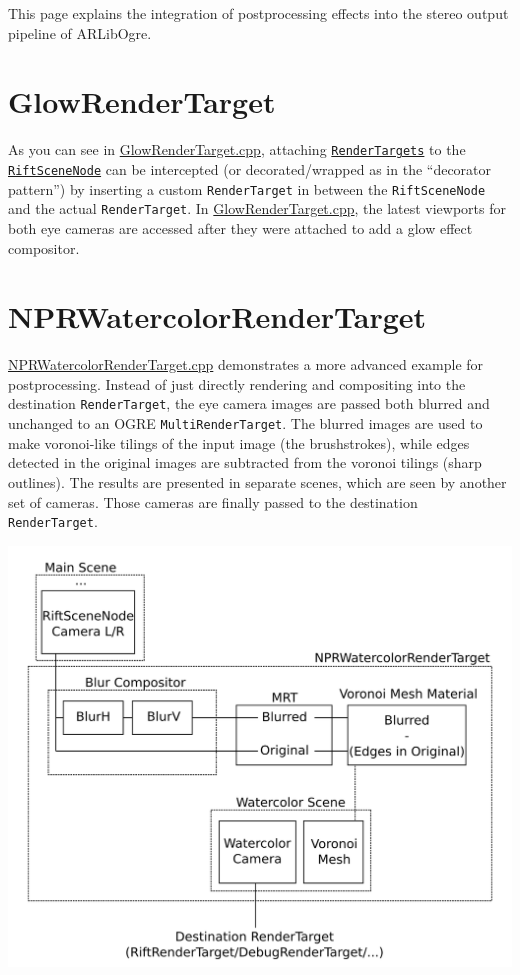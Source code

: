 This page explains the integration of postprocessing effects into the stereo output pipeline of ARLibOgre.

\section{GlowRenderTarget}\label{glowrendertarget}

As you can see in
\href{https://github.com/ands/OculusMeetsAR/blob/master/ARLib_Samples/RemoteGame/src/GlowRenderTarget.cpp}{GlowRenderTarget.cpp},
attaching
\hyperref[sec:ogre_library]{\texttt{RenderTargets}}
to the
\href{https://github.com/ands/OculusMeetsAR/blob/master/ARLib/include/ARLib/Ogre/RiftSceneNode.h}{\texttt{RiftSceneNode}}
can be intercepted (or decorated/wrapped as in the ``decorator
pattern'') by inserting a custom \texttt{RenderTarget} in between the
\texttt{RiftSceneNode} and the actual \texttt{RenderTarget}. In
\href{https://github.com/ands/OculusMeetsAR/blob/master/ARLib_Samples/RemoteGame/src/GlowRenderTarget.cpp}{GlowRenderTarget.cpp},
the latest viewports for both eye cameras are accessed after they were
attached to add a glow effect compositor.

\section{NPRWatercolorRenderTarget}\label{nprwatercolorrendertarget}

\href{https://github.com/ands/OculusMeetsAR/blob/master/ARLib_Samples/Common/src/NPRWatercolorRenderTarget.cpp}{NPRWatercolorRenderTarget.cpp}
demonstrates a more advanced example for postprocessing. Instead of just
directly rendering and compositing into the destination \texttt{RenderTarget},
the eye camera images are passed both blurred and unchanged to an OGRE
\texttt{MultiRenderTarget}. The blurred images are used to make voronoi-like
tilings of the input image (the brushstrokes), while edges detected in
the original images are subtracted from the voronoi tilings (sharp
outlines). The results are presented in separate scenes, which are seen
by another set of cameras. Those cameras are finally passed to the
destination \texttt{RenderTarget}.

\includegraphics*[width=.92\textwidth]{NPRWatercolorRenderTarget.png}

